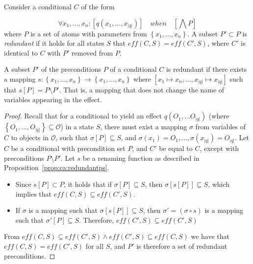 \documentclass[../Master.tex]{subfiles}
\begin{document}
\begin{definition}\label{def:ca:redundantps}
Consider a conditional $C$ of the form

    \begin{equation*}
        \forall x_1, \dots, x_n : [q\left(x_1, \dots, x_{|q|}\right)] \quad when \quad \left[\bigwedge P\right]
    \end{equation*}
    where $P$ is a set of atoms with parameters from $\left\{x_1, \dots, x_n \right\}$.
    A subset $P' \subset P$ is \emph{redundant} if it holds for all states $S$ that $eff (C,S) = eff \left(C',S\right)$, where $C'$ is identical to $C$ with $P'$ removed from $P$.
\end{definition}



\begin{proposition}\label{prop:ca:redundantps}
    A subset $P'$ of the preconditions $P$ of a conditional $C$ is redundant if there exists a mapping $s : \left\{ x_1, \dots, x_n \right\} \rightarrow \left\{ x_1, \dots, x_n \right\}$ where $\left[ x_1 \mapsto x_n, \dots, x_{|q|} \mapsto x_{|q|}\right]$ such that $s \left[P\right] = P \setminus P'$. That is, a mapping that does not change the name of variables appearing in the effect.
\end{proposition}

\begin{proof} 
    Recall that for a conditional to yield an effect $q\left(O_1, \dots O_{|q|}\right)$ (where $\left\{ O_1, \dots, O_{|q|}\right\} \subseteq \mathcal{O}$) in a state $S$, there must exist a mapping $\sigma$ from variables of $C$ to objects in $\mathcal{O}$, such that $\sigma\left[ P \right] \subseteq S$, and $\sigma\left(x_1\right) = O_1, \dots, \sigma\left(x_{|q|}\right) = O_{|q|}$. Let $C$ be a conditional with precondition set $P$, and $C'$ be equal to $C$, except with preconditions $P \setminus P'$. Let $s$ be a renaming function as described in Proposition~\ref{prop:ca:redundantps}.
    \begin{itemize}
        \item Since $s\left[ P \right] \subset P$, it holds that if $\sigma \left[ P \right] \subseteq S$, then $\sigma \left[ s \left[ P \right] \right] \subseteq S$, which implies that $eff(C,S) \subseteq eff(C',S)$.

        \item If $\sigma$ is a mapping such that $\sigma \left[ s \left[ P \right]\right] \subseteq S$, then $\sigma' = \left(\sigma \circ s \right)$ is a mapping such that $\sigma' \left[P\right] \subseteq S$. Therefore, $eff(C', S) \subseteq eff(C', S)$
    \end{itemize}
    From $eff(C, S) \subseteq eff(C',S) \land eff(C',S) \subseteq eff(C, S)$ we have that $eff(C,S) = eff(C',S)$ for all $S$, and $P'$ is therefore a set of redundant preconditions.
\end{proof}
\end{document}
